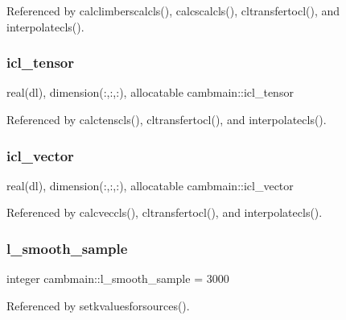 Referenced by calclimberscalcls(), calcscalcls(), cltransfertocl(), and interpolatecls().

\mbox{\label{namespacecambmain_ad09fccee49c220454529f80e65beb489}} 
\subsubsection{\texorpdfstring{icl\+\_\+tensor}{icl\_tensor}}
{\footnotesize\ttfamily real(dl), dimension(\+:,\+:,\+:), allocatable cambmain\+::icl\+\_\+tensor\hspace{0.3cm}{\ttfamily [private]}}



Referenced by calctenscls(), cltransfertocl(), and interpolatecls().

\mbox{\label{namespacecambmain_a2044e91de72f6f3c0c0e2f87ab2c6a04}} 
\subsubsection{\texorpdfstring{icl\+\_\+vector}{icl\_vector}}
{\footnotesize\ttfamily real(dl), dimension(\+:,\+:,\+:), allocatable cambmain\+::icl\+\_\+vector\hspace{0.3cm}{\ttfamily [private]}}



Referenced by calcveccls(), cltransfertocl(), and interpolatecls().

\mbox{\label{namespacecambmain_a3ebcb0843a6249a58a33f83e5cf9b73b}} 
\subsubsection{\texorpdfstring{l\+\_\+smooth\+\_\+sample}{l\_smooth\_sample}}
{\footnotesize\ttfamily integer cambmain\+::l\+\_\+smooth\+\_\+sample = 3000\hspace{0.3cm}{\ttfamily [private]}}



Referenced by setkvaluesforsources().

